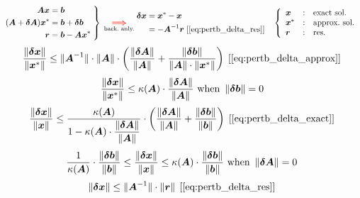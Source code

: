 \documentclass[12pt, leqno]{article}
\begin{document}
\pagebreak

\mvs{1em}
\[
	\left. \begin{aligned}
		\fbs{Ax} &= \fbs{b} \\
		(\fbs{A}+\fbs{\delta A})\fbs{x}^\ast &= \fbs{b} + \fbs{\delta b} \\
		\fbs{r} &= \fbs{b}-\fbs{Ax}^\ast \\
	\end{aligned} \; \right\}
	\; \underset{\text{back.\@ anly.\@}}{\frdbs{\Longrightarrow}} \;
	\begin{aligned}
		\fbs{\delta x} &= \fbs{x}^\ast - \fbs{x} \\
		&= -\fbs{A}^{-1}\fbs{r} \;[\ref{eq:pertb_delta_res}] \\
	\end{aligned} \quad
	\left\{ \begin{array}{lcl}
		\fbs{x} & : & \text{exact sol.\@} \\
		\fbs{x}^\ast & : & \text{approx.\@ sol.} \\
		\fbs{r} & : & \text{res.} \\
	\end{array} \right.
\]
\tvs
{}
\evs
\[
	\dfrac{\left\lVert \boldsymbol{\delta x} \right\rVert}{\left\lVert \boldsymbol{x}^\ast \right\rVert} \leq
	\lVert \boldsymbol{A}^{-1} \rVert \cdot \left\lVert \boldsymbol{A} \right\rVert \cdot \left( 
		\dfrac{\left\lVert \boldsymbol{\delta A} \right\rVert}{\left\lVert \boldsymbol{A} \right\rVert} +
		\dfrac{\left\lVert \boldsymbol{\delta b} \right\rVert}{\left\lVert \boldsymbol{A} \right\rVert \cdot \left\lVert \boldsymbol{x}^\ast \right\rVert}
	 \right) \;[\ref{eq:pertb_delta_approx}]
\]
\[
	\dfrac{\left\lVert \boldsymbol{\delta x} \right\rVert}{\left\lVert \boldsymbol{x}^\ast \right\rVert} \leq \kappa(\boldsymbol{A})
	\cdot
	\dfrac{\left\lVert \boldsymbol{\delta A} \right\rVert}{\left\lVert \boldsymbol{A} \right\rVert} \text{ when }
	\left\lVert \boldsymbol{\delta b} \right\rVert=0
\]
\evs
\[
	\dfrac{\left\lVert \boldsymbol{\delta x} \right\rVert}{\left\lVert \boldsymbol{x} \right\rVert} \leq
	\dfrac{\kappa(\boldsymbol{A})}{1-\kappa(\boldsymbol{A}) \cdot \dfrac{\left\lVert \boldsymbol{\delta
	A} \right\rVert}{\left\lVert \boldsymbol{A} \right\rVert}} \cdot \left( 
		\dfrac{\left\lVert \boldsymbol{\delta A} \right\rVert}{\left\lVert \boldsymbol{A} \right\rVert} +
		\dfrac{\left\lVert \boldsymbol{\delta b} \right\rVert}{\left\lVert \boldsymbol{b} \right\rVert}
	 \right) \;[\ref{eq:pertb_delta_exact}]
\]
\[
	\dfrac{1}{\kappa(\boldsymbol{A})} \cdot \dfrac{\left\lVert \boldsymbol{\delta
	b} \right\rVert}{\left\lVert \boldsymbol{b} \right\rVert} \leq
	\dfrac{\left\lVert \boldsymbol{\delta x} \right\rVert}{\left\lVert \boldsymbol{x} \right\rVert} \leq
	\kappa(\boldsymbol{A}) \cdot \dfrac{\left\lVert \boldsymbol{\delta b} \right\rVert}{\left\lVert \boldsymbol{b} \right\rVert}
	\text{ when } \left\lVert \boldsymbol{\delta A} \right\rVert=0
\]
\evs
\[
	\left\lVert \boldsymbol{\delta x} \right\rVert \leq \lVert \boldsymbol{A}^{-1} \rVert \cdot \left\lVert \boldsymbol{r} \right\rVert
	\;[\ref{eq:pertb_delta_res}]
\]
\end{document}
